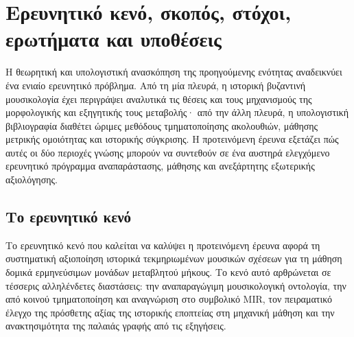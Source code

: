 \documentclass[11pt,a4paper]{article}
\begin{document}

\section{Ερευνητικό κενό, σκοπός, στόχοι, ερωτήματα και υποθέσεις}\label{ux3b5ux3c1ux3b5ux3c5ux3bdux3b7ux3c4ux3b9ux3baux3cc-ux3baux3b5ux3bdux3cc-ux3c3ux3baux3bfux3c0ux3ccux3c2-ux3c3ux3c4ux3ccux3c7ux3bfux3b9-ux3b5ux3c1ux3c9ux3c4ux3aeux3bcux3b1ux3c4ux3b1-ux3baux3b1ux3b9-ux3c5ux3c0ux3bfux3b8ux3adux3c3ux3b5ux3b9ux3c2}

Η θεωρητική και υπολογιστική ανασκόπηση της προηγούμενης ενότητας αναδεικνύει ένα ενιαίο ερευνητικό πρόβλημα. Από τη μία πλευρά, η ιστορική βυζαντινή μουσικολογία έχει περιγράψει αναλυτικά τις θέσεις και τους μηχανισμούς της μορφολογικής και εξηγητικής τους μεταβολής· από την άλλη πλευρά, η υπολογιστική βιβλιογραφία διαθέτει ώριμες μεθόδους τμηματοποίησης ακολουθιών, μάθησης μετρικής ομοιότητας και ιστορικής σύγκρισης. Η προτεινόμενη έρευνα εξετάζει πώς αυτές οι δύο περιοχές γνώσης μπορούν να συντεθούν σε ένα αυστηρά ελεγχόμενο ερευνητικό πρόγραμμα αναπαράστασης, μάθησης και ανεξάρτητης εξωτερικής αξιολόγησης.

\subsection{Το ερευνητικό κενό}\label{ux3c4ux3bf-ux3b5ux3c1ux3b5ux3c5ux3bdux3b7ux3c4ux3b9ux3baux3cc-ux3baux3b5ux3bdux3cc}

Το ερευνητικό κενό που καλείται να καλύψει η προτεινόμενη έρευνα αφορά τη συστηματική αξιοποίηση ιστορικά τεκμηριωμένων μουσικών σχέσεων για τη μάθηση δομικά ερμηνεύσιμων μονάδων μεταβλητού μήκους. Το κενό αυτό αρθρώνεται σε τέσσερις αλληλένδετες διαστάσεις: την αναπαραγώγιμη μουσικολογική οντολογία, την από κοινού τμηματοποίηση και αναγνώριση στο συμβολικό MIR, τον πειραματικό έλεγχο της πρόσθετης αξίας της ιστορικής εποπτείας στη μηχανική μάθηση και την ανακτησιμότητα της παλαιάς γραφής από τις εξηγήσεις.
\end{document}
